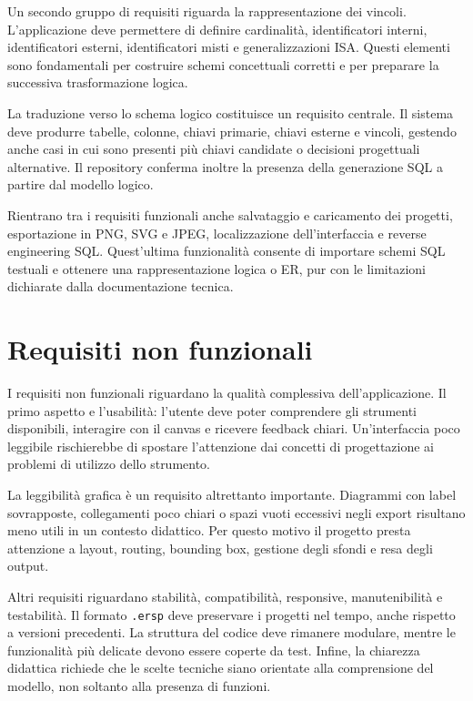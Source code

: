 \documentclass{unipd-thesis-modern}
\begin{document}
Un secondo gruppo di requisiti riguarda la rappresentazione dei vincoli. L'applicazione deve permettere di definire cardinalità, identificatori interni, identificatori esterni, identificatori misti e generalizzazioni ISA. Questi elementi sono fondamentali per costruire schemi concettuali corretti e per preparare la successiva trasformazione logica.

La traduzione verso lo schema logico costituisce un requisito centrale. Il sistema deve produrre tabelle, colonne, chiavi primarie, chiavi esterne e vincoli, gestendo anche casi in cui sono presenti più chiavi candidate o decisioni progettuali alternative. Il repository conferma inoltre la presenza della generazione SQL a partire dal modello logico.

Rientrano tra i requisiti funzionali anche salvataggio e caricamento dei progetti, esportazione in PNG, SVG e JPEG, localizzazione dell'interfaccia e reverse engineering SQL. Quest'ultima funzionalità consente di importare schemi SQL testuali e ottenere una rappresentazione logica o ER, pur con le limitazioni dichiarate dalla documentazione tecnica.

\section{Requisiti non funzionali}

I requisiti non funzionali riguardano la qualità complessiva dell'applicazione. Il primo aspetto e l'usabilità: l'utente deve poter comprendere gli strumenti disponibili, interagire con il canvas e ricevere feedback chiari. Un'interfaccia poco leggibile rischierebbe di spostare l'attenzione dai concetti di progettazione ai problemi di utilizzo dello strumento.

La leggibilità grafica è un requisito altrettanto importante. Diagrammi con label sovrapposte, collegamenti poco chiari o spazi vuoti eccessivi negli export risultano meno utili in un contesto didattico. Per questo motivo il progetto presta attenzione a layout, routing, bounding box, gestione degli sfondi e resa degli output.

Altri requisiti riguardano stabilità, compatibilità, responsive, manutenibilità e testabilità. Il formato \texttt{.ersp} deve preservare i progetti nel tempo, anche rispetto a versioni precedenti. La struttura del codice deve rimanere modulare, mentre le funzionalità più delicate devono essere coperte da test. Infine, la chiarezza didattica richiede che le scelte tecniche siano orientate alla comprensione del modello, non soltanto alla presenza di funzioni.
\end{document}
